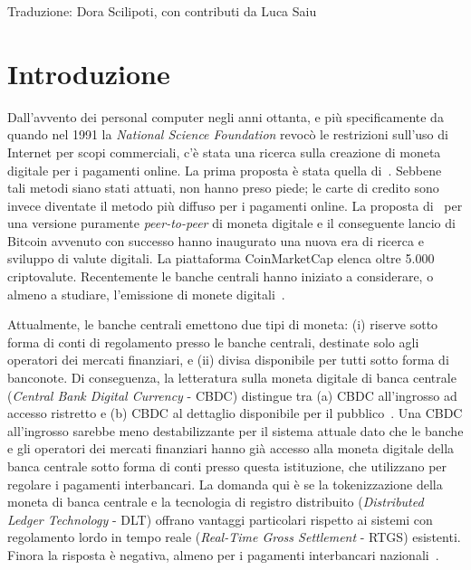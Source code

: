 \documentclass[a4paper]{article}
\begin{document}
Traduzione: Dora Scilipoti, con contributi da Luca Saiu
\newpage



\section{Introduzione}\label{1.-introduzione}

Dall'avvento dei personal computer negli anni ottanta, e più
specificamente da quando nel 1991 la \textit{National Science
Foundation} revocò le restrizioni sull'uso di Internet per scopi
commerciali, c'è stata una ricerca sulla creazione di moneta digitale
per i pagamenti online. La prima proposta è stata quella
di~\cite{Chaum1983}. Sebbene tali metodi siano stati attuati, non hanno
preso piede; le carte di credito sono invece diventate il metodo più
diffuso per i pagamenti online. La proposta di~\cite{Nakamoto} per una
versione puramente \textit{peer-to-peer} di moneta digitale e il
conseguente lancio di Bitcoin avvenuto con successo hanno inaugurato
una nuova era di ricerca e sviluppo di valute digitali. La piattaforma
CoinMarketCap elenca oltre 5.000 criptovalute. Recentemente le banche
centrali hanno iniziato a considerare, o almeno a studiare,
l'emissione di monete digitali~\cite[vedi][]{AuerBoehme,AuerCornelli,Boar,Kiff,Mancini-Griffoli}.

Attualmente, le banche centrali emettono due tipi di moneta: (i)
riserve sotto forma di conti di regolamento presso le banche centrali,
destinate solo agli operatori dei mercati finanziari, e (ii) divisa
disponibile per tutti sotto forma di banconote. Di conseguenza, la
letteratura sulla moneta digitale di banca centrale (\textit{Central Bank
Digital Currency} - CBDC) distingue tra (a) CBDC all'ingrosso ad
accesso ristretto e (b) CBDC al dettaglio disponibile per il
pubblico~\cite[si veda, ad esempio,][]{Bech}.
Una CBDC all'ingrosso sarebbe meno destabilizzante per il sistema attuale
dato che le banche e gli operatori dei mercati finanziari hanno già
accesso alla moneta digitale della banca centrale sotto forma di conti
presso questa istituzione, che utilizzano per regolare i pagamenti
interbancari. La domanda qui è se la tokenizzazione della moneta di banca
centrale e la tecnologia di registro distribuito (\textit{Distributed Ledger
Technology} - DLT) offrano vantaggi particolari rispetto ai sistemi con
regolamento lordo in tempo reale (\textit{Real-Time Gross Settlement} - RTGS)
esistenti. Finora la risposta è negativa, almeno per i pagamenti
interbancari nazionali~\cite[vedi][]{Chapman}.
\end{document}
